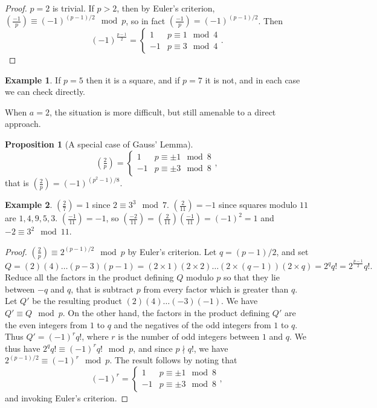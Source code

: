 \documentclass{article}
\newcommand{\rb}[1]{\left( #1 \right)}
\newcommand{\legendre}[2]{\rb{\tfrac{#1}{#2}}}
\theoremstyle{definition}\newtheorem{definition}{Definition}
\theoremstyle{definition}\newtheorem*{remark}{Remark}
\theoremstyle{definition}\newtheorem*{example}{Example}
\theoremstyle{definition}\newtheorem*{note}{Note}
\newtheorem{proposition}[definition]{Proposition}
\begin{document}
\begin{proof}
$ p = 2 $ is trivial. If $ p > 2 $, then by Euler's criterion, $ \legendre{-1}{p} \equiv \rb{-1}^{\rb{p - 1} / 2} \mod p $, so in fact $ \legendre{-1}{p} = \rb{-1}^{\rb{p - 1} / 2} $. Then
$$ \rb{-1}^{\tfrac{p - 1}{2}} = \begin{cases} 1 & p \equiv 1 \mod 4 \\ -1 & p \equiv 3 \mod 4 \end{cases}. $$
\end{proof}

\begin{example}
If $ p = 5 $ then it is a square, and if $ p = 7 $ it is not, and in each case we can check directly.
\end{example}

When $ a = 2 $, the situation is more difficult, but still amenable to a direct approach.

\begin{proposition}[A special case of Gauss' Lemma]
$$ \legendre{2}{p} = \begin{cases} 1 & p \equiv \pm 1 \mod 8 \\ -1 & p \equiv \pm 3 \mod 8 \end{cases}, $$
that is $ \legendre{2}{p} = \rb{-1}^{\rb{p^2 - 1} / 8} $.
\end{proposition}

\begin{example}
$ \legendre{2}{7} = 1 $ since $ 2 \equiv 3^3 \mod 7 $. $ \legendre{2}{11} = -1 $ since squares modulo $ 11 $ are $ 1, 4, 9, 5, 3 $. $ \legendre{-1}{11} = -1 $, so $ \legendre{-2}{11} = \legendre{2}{11}\legendre{-1}{11} = \rb{-1}^2 = 1 $ and $ -2 \equiv 3^2 \mod 11 $.
\end{example}

\begin{proof}
$ \legendre{2}{p} \equiv 2^{\rb{p - 1} / 2} \mod p $ by Euler's criterion. Let $ q = \rb{p - 1} / 2 $, and set
$$ Q = \rb{2}\rb{4} \dots \rb{p - 3}\rb{p - 1} = \rb{2 \times 1}\rb{2 \times 2} \dots \rb{2 \times \rb{q - 1}}\rb{2 \times q} = 2^qq! = 2^{\tfrac{p - 1}{2}}q!. $$
Reduce all the factors in the product defining $ Q $ modulo $ p $ so that they lie between $ -q $ and $ q $, that is subtract $ p $ from every factor which is greater than $ q $. Let $ Q' $ be the resulting product $ \rb{2}\rb{4} \dots \rb{-3}\rb{-1} $. We have $ Q' \equiv Q \mod p $. On the other hand, the factors in the product defining $ Q' $ are the even integers from $ 1 $ to $ q $ and the negatives of the odd integers from $ 1 $ to $ q $. Thus $ Q' = \rb{-1}^rq! $, where $ r $ is the number of odd integers between $ 1 $ and $ q $. We thus have $ 2^qq! \equiv \rb{-1}^rq! \mod p $, and since $ p \nmid q! $, we have $ 2^{\rb{p - 1} / 2} \equiv \rb{-1}^r \mod p $. The result follows by noting that
$$ \rb{-1}^r = \begin{cases} 1 & p \equiv \pm 1 \mod 8 \\ -1 & p \equiv \pm 3 \mod 8 \end{cases}, $$
and invoking Euler's criterion.
\end{proof}
\end{document}
